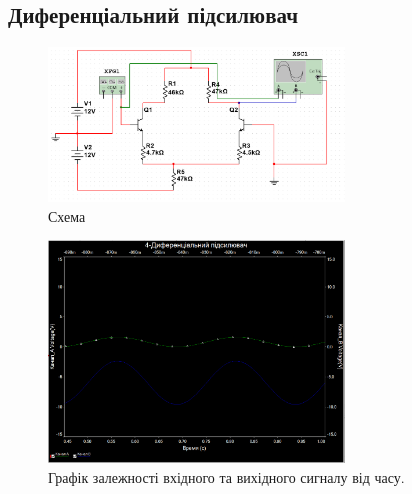 \documentclass[
  ukrainian,
  14pt
]{extreport}
\begin{document}
\subsection{Диференціальний підсилювач}
\begin{figure}[H]
  \includegraphics[width=0.7\textwidth]{imgs/4-1.png}
  \centering
  \caption{Схема}
\end{figure}
\begin{figure}[H]
  \includegraphics[width=0.7\textwidth]{imgs/4-2.png}
  \centering
  \caption{Графік залежності вхідного та вихідного сигналу від часу.
  }
\end{figure}
\end{document}
